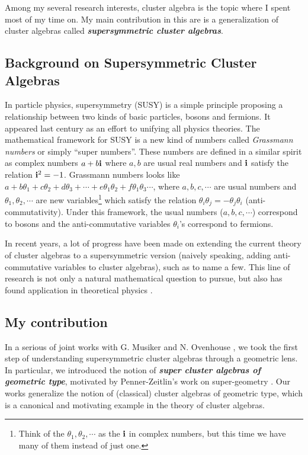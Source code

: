 \documentclass[11pt]{amsart}
\renewcommand{\i}[0]{{\bf i}}
\newcommand{\Emph}[1]{\textbf{\emph{#1}}}
\begin{document}
Among my several research interests, cluster algebra is the topic where I spent most of my time on. My main contribution in this are is a generalization of cluster algebras called \Emph{supersymmetric cluster algebras}.


\subsection*{Background on Supersymmetric Cluster Algebras}
In particle physics, supersymmetry (SUSY) is a simple principle proposing a relationship between two kinds of basic particles, bosons and fermions. It appeared last century as an effort to unifying all physics theories. The mathematical framework for SUSY is a new kind of numbers called \emph{Grassmann numbers} or simply ``super numbers''. These numbers are defined in a similar spirit as complex numbers $a+b\i$ where $a,b$ are usual real numbers and $\i$ satisfy the relation $\i^2=-1$. Grassmann numbers looks like $a+b\theta_1+c\theta_2+d\theta_3+\cdots +e\theta_1\theta_2+f\theta_1\theta_3\cdots$, where $a,b,c,\cdots$ are usual numbers and $\theta_1,\theta_2,\cdots$ are new variables\footnote{Think of the $\theta_1,\theta_2,\cdots$ as the $\i$ in complex numbers, but this time we have many of them instead of just one.} which satisfy the relation $\theta_i\theta_j=-\theta_j\theta_i$ (anti-commutativity). Under this framework, the usual numbers ($a,b,c,\cdots$) correspond to bosons and the anti-commutative variables $\theta_i$'s correspond to fermions.

In recent years, a lot of progress have been made on extending the current theory of cluster algebras to a supersymmetric version (naively speaking, adding anti-commutative variables to cluster algebras), such as \cite{ovsienko2018cluster, shemyakova2022super} to name a few.
This line of research is not only a natural mathematical question to pursue, but also has  found application in theoretical physics \cite{gates2021cluster}.
\subsection*{My contribution}
In a serious of joint works with G. Musiker and N. Ovenhouse \cite{moz1,moz2,moz3}, we took the first step of understanding supersymmetric cluster algebras through a geometric lens. In particular, we introduced the notion of \Emph{super cluster algebras of geometric type}, motivated by Penner-Zeitlin's work on super-geometry \cite{penner2019decorated}. Our works generalize the notion of (classical) cluster algebras of geometric type, which is a canonical and motivating example in the theory of cluster algebras. 
\end{document}

